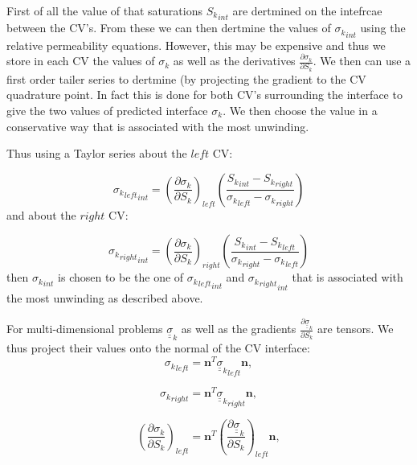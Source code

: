 First of all the value of that saturations ${S_k}_{int}$ 
are dertmined on the intefrcae between the CV's. 
From these we can then dertmine the values of ${\sigma_k}_{int}$ 
using the relative permeability equations. However, 
this may be expensive and thus we store 
in each CV the values of $\sigma_k$ as well 
as the derivatives $\frac{\partial \sigma_k}{\partial S_k}$. We then 
can use a first order tailer series to dertmine 
(by projecting the gradient 
to the CV quadrature point. In fact this is done for 
both CV's surrounding the interface to give the 
two values of predicted interface ${\sigma_k}$. 
We then choose the value in a conservative way that 
is associated with the most unwinding. 

Thus using a Taylor series about the $left$ CV:

\begin{equation}
{{\sigma_k}_{left}}_{int}
=
\left( 
\frac{\partial \sigma_k}{\partial {S_k}}
\right)_{left}
\left( 
\frac{ 
 {S_k}_{int} - {S_k}_{right} } 
{{\sigma_k}_{left} - {\sigma_k}_{right} }
\right) 
\end{equation}
and about the $right$ CV:

\begin{equation}
{{\sigma_k}_{right}}_{int}
=
\left( \frac{\partial \sigma_k}{\partial {S_k}}
\right)_{right}
\left( 
\frac{ 
 {S_k}_{int} - {S_k}_{left} } 
{{\sigma_k}_{right} - {\sigma_k}_{left} }
\right) 
\end{equation}
then ${{\sigma_k}}_{int}$ is chosen to be the one 
of ${{\sigma_k}_{left}}_{int}$ and ${{\sigma_k}_{right}}_{int}$
that is associated with the most unwinding as described above.


For multi-dimensional problems ${\underline {\underline \sigma}}_k$ as well 
as the gradients $\frac{\partial {\underline {\underline \sigma}}_k}{\partial S_k}$ 
are tensors. We thus project their values 
onto the normal of the CV interface:
\begin{equation}
{\sigma_k}_{left} = {\mathbf n}^T {{\underline {\underline \sigma}}_k}_{left} {\mathbf n},
\end{equation}

\begin{equation}
{\sigma_k}_{right} = {\mathbf n}^T {{\underline {\underline \sigma}}_k}_{right} {\mathbf n}, 
\end{equation}

\begin{equation}
\left({\frac{\partial \sigma_k}{\partial S_k}}\right)_{left} = 
{\mathbf n}^T \left( {\frac{\partial {\underline {\underline \sigma}}_k}{\partial S_k}}\right)_{left} {\mathbf n}, 
\end{equation}

